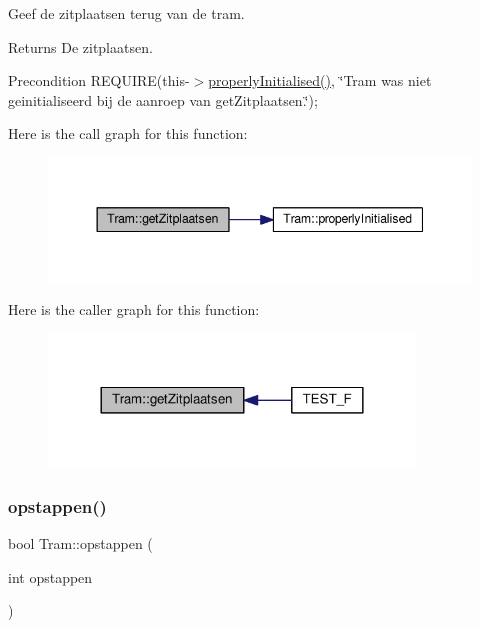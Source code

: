 Geef de zitplaatsen terug van de tram. 

\begin{DoxyReturn}{Returns}
De zitplaatsen. 
\end{DoxyReturn}
\begin{DoxyPrecond}{Precondition}
R\+E\+Q\+U\+I\+RE(this-\/$>$\hyperlink{class_tram_ac2688f590e4db232b4f535c9bf959efb}{properly\+Initialised()}, \char`\"{}\+Tram was niet geinitialiseerd bij de aanroep van get\+Zitplaatsen.\char`\"{}); 
\end{DoxyPrecond}
Here is the call graph for this function\+:\nopagebreak
\begin{figure}[H]
\begin{center}
\leavevmode
\includegraphics[width=344pt]{class_tram_abcb1ce0d10e394fce8a99b460e5104de_cgraph}
\end{center}
\end{figure}
Here is the caller graph for this function\+:\nopagebreak
\begin{figure}[H]
\begin{center}
\leavevmode
\includegraphics[width=276pt]{class_tram_abcb1ce0d10e394fce8a99b460e5104de_icgraph}
\end{center}
\end{figure}
\mbox{\label{class_tram_aaeb00c535a6854f85dcc42cdff97ad0c}} 
\subsubsection{\texorpdfstring{opstappen()}{opstappen()}}
{\footnotesize\ttfamily bool Tram\+::opstappen (\begin{DoxyParamCaption}\item[{int}]{opstappen }\end{DoxyParamCaption})}



